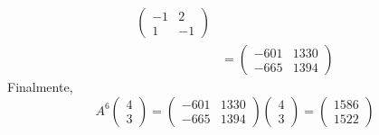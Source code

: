 \begin{example}
\begin{myproof}
\begin{align*}
\begin{pmatrix} -1 & 2 \\ 1 & -1 \end{pmatrix} \\
&= \begin{pmatrix} -601 & 1330 \\ -665 & 1394 \end{pmatrix}
\end{align*}
Finalmente,
\[
A^6 \begin{pmatrix} 4 \\ 3 \end{pmatrix}
= \begin{pmatrix} -601 & 1330 \\ -665 & 1394 \end{pmatrix} \begin{pmatrix} 4 \\ 3 \end{pmatrix}
= \begin{pmatrix} 1586 \\ 1522 \end{pmatrix}
\]
\end{myproof}
\end{example}


